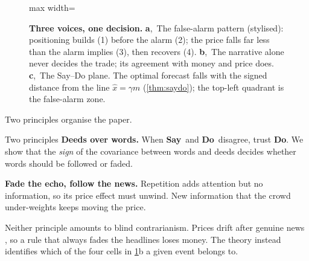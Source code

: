 \documentclass[11pt,a4paper]{article}
\theoremstyle{sci}
\theoremstyle{scidef}
\newcommand{\SAY}{\textcolor{say}{\textsf{\textbf{Say}}}}
\newcommand{\DO}{\textcolor{do}{\textsf{\textbf{Do}}}}
\begin{document}
\begin{figure}[t]
\begin{minipage}[t]{0.48\linewidth}
\begin{adjustbox}{max width=\linewidth}
\end{adjustbox}
\end{minipage}
\caption{\textbf{Three voices, one decision.} \textbf{a},~The false-alarm pattern (stylised): positioning builds (1) before the alarm (2); the price falls far less than the alarm implies (3), then recovers (4). \textbf{b},~The narrative alone never decides the trade; its agreement with money and price does. \textbf{c},~The Say--Do plane. The optimal forecast falls with the signed distance from the line $\hat x=\gamma m$ (\cref{thm:saydo}); the top-left quadrant is the false-alarm zone.}
\label{fig:teaser}
\end{figure}

Two principles organise the paper.

\begin{keybox}{Two principles}
\textbf{Deeds over words.} When \SAY\ and \DO\ disagree, trust \DO. We show that the \emph{sign} of the covariance between words and deeds decides whether words should be followed or faded.

\smallskip
\textbf{Fade the echo, follow the news.} Repetition adds attention but no information, so its price effect must unwind. New information that the crowd under-weights keeps moving the price.
\end{keybox}

Neither principle amounts to blind contrarianism. Prices drift after genuine news \citep{chan2003}, so a rule that always fades the headlines loses money. The theory instead identifies which of the four cells in \cref{fig:teaser}b a given event belongs to.
\end{document}
